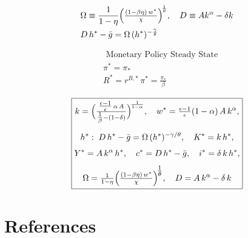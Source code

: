 \documentclass[11pt,preprint]{elsarticle}
\numberwithin{equation}{section}
\numberwithin{figure}{section}
\numberwithin{table}{section}
\begin{document}
\begin{align*}
& \Omega \equiv \frac{1}{1-\eta}
                 \Bigl(\tfrac{(1-\beta\eta)\,w^*}{\chi}\Bigr)^{\!\frac{1}{\theta}}, 
\quad
D \equiv A k^\alpha - \delta k \\
& D\,h^* - \bar{g} = \Omega\,(h^*)^{-\frac{\gamma}{\theta}}
\end{align*}

\begin{align*}
& \text{ Monetary Policy Steady State} \\
& \pi^* = \pi_* \\
& R^* = r^{B,*}\,\pi^* = \frac{\pi_*}{\beta}
\end{align*}

\begin{equation}\label{closed_form_ss}
\boxed{
  \begin{gathered}
    k = \Bigl(\tfrac{\tfrac{\epsilon-1}{\epsilon}\,\alpha\,A}
                  {\tfrac{1}{\beta} - (1-\delta)}\Bigr)^{\!\frac{1}{1-\alpha}},
    \quad
    w^* = \tfrac{\epsilon-1}{\epsilon}(1-\alpha)\,A\,k^\alpha, \\[6pt]
    h^*:\; D\,h^* - \bar{g} = \Omega\,(h^*)^{-\gamma/\theta}, 
    \quad
    K^* = k\,h^*, 
    \\[4pt]
    Y^* = A\,k^\alpha\,h^*, 
    \quad 
    c^* = D\,h^* - \bar{g}, 
    \quad 
    i^* = \delta\,k\,h^*,
    \\[4pt]
    \Omega = \tfrac{1}{1-\eta}
             \Bigl(\tfrac{(1-\beta\eta)\,w^*}{\chi}\Bigr)^{\!\tfrac{1}{\theta}},
    \quad
    D = A\,k^\alpha - \delta\,k
  \end{gathered}
}
\end{equation}

\newpage

\section*{References}\label{references}
\end{document}
